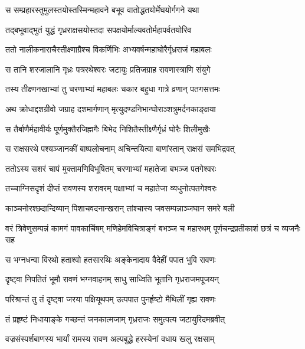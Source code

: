 \twolineshloka
{स सम्प्रहारस्तुमुलस्तयोस्तस्मिन्महावने}
{बभूव वातोद्धतयोर्मेघयोर्गगने यथा} %

\twolineshloka
{तद्बभूवाद्भुतं युद्धं गृध्रराक्षसयोस्तदा}
{सपक्षयोर्माल्यवतोर्महापर्वतयोरिव} %

\twolineshloka
{ततो नालीकनाराचैस्तीक्ष्णाग्रैश्च विकर्णिभिः}
{अभ्यवर्षन्महाघोरैर्गृध्रराजं महाबलः} %

\twolineshloka
{स तानि शरजालानि गृध्रः पत्ररथेश्वरः}
{जटायुः प्रतिजग्राह रावणास्त्राणि संयुगे} %

\twolineshloka
{तस्य तीक्ष्णनखाभ्यां तु चरणाभ्यां महाबलः}
{चकार बहुधा गात्रे व्रणान् पतगसत्तमः} %

\twolineshloka
{अथ क्रोधाद्दशग्रीवो जग्राह दशमार्गणान्}
{मृत्युदण्डनिभान्घोराञ्शत्रुमर्दनकाङ्क्षया} %

\twolineshloka
{स तैर्बाणैर्महावीर्यः पूर्णमुक्तैरजिह्मगैः}
{बिभेद निशितैस्तीक्ष्णैर्गृध्रं घोरैः शिलीमुखैः} %

\twolineshloka
{स राक्षसरथे पश्यञ्जानकीं बाष्पलोचनाम्}
{अचिन्तयित्वा बाणांस्तान् राक्षसं समभिद्रवत्} %

\twolineshloka
{ततोऽस्य सशरं चापं मुक्तामणिविभूषितम्}
{चरणाभ्यां महातेजा बभञ्ज पतगेश्वरः} %

\twolineshloka
{तच्चाग्निसदृशं दीप्तं रावणस्य शरावरम्}
{पक्षाभ्यां च महातेजा व्यधुनोत्पतगेश्वरः} %

\twolineshloka
{काञ्चनोरश्छदान्दिव्यान् पिशाचवदनान्खरान्}
{तांश्चास्य जवसम्पन्नाञ्जघान समरे बली} %

\threelineshloka
{वरं त्रिवेणुसम्पन्नं कामगं पावकार्चिषम्}
{मणिहेमविचित्राङ्गं बभञ्ज च महारथम्}
{पूर्णचन्द्रप्रतीकाशं छत्रं च व्यजनैः सह} %

\twolineshloka
{स भग्नधन्वा विरथो हताश्वो हतसारथिः}
{अङ्केनादाय वैदेहीं पपात भुवि रावणः} %

\twolineshloka
{दृष्ट्वा निपतितं भूमौ रावणं भग्नवाहनम्}
{साधु साध्विति भूतानि गृध्रराजमपूजयन्} %

\twolineshloka
{परिश्रान्तं तु तं दृष्ट्वा जरया पक्षियूथपम्}
{उत्पपात पुनर्हृष्टो मैथिलीं गृह्य रावणः} %

\twolineshloka
{तं प्रहृष्टं निधायाङ्के गच्छन्तं जनकात्मजाम्}
{गृध्रराजः समुत्पत्य जटायुरिदमब्रवीत्} %

\twolineshloka
{वज्रसंस्पर्शबाणस्य भार्यां रामस्य रावण}
{अल्पबुद्धे हरस्येनां वधाय खलु रक्षसाम्} %

